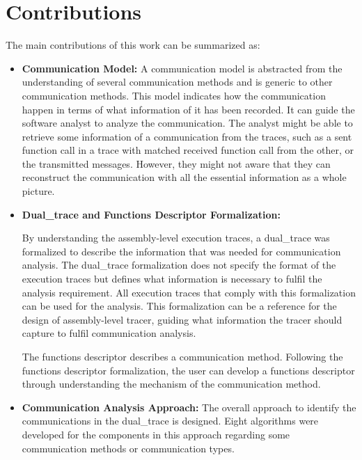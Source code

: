 \section{Contributions}
The main contributions of this work can be summarized as:
\begin{itemize}
  \item \textbf{Communication Model:} A communication model is abstracted from the understanding of several communication methods and is generic to other communication methods. This model indicates how the communication happen in terms of what information of it has been recorded. It can guide the software analyst to analyze the communication. The analyst might be able to retrieve some information of a communication from the traces, such as a sent function call in a trace with matched received function call from the other, or the transmitted messages. However, they might not aware that they can reconstruct the communication with all the essential information as a whole picture.
  
  \item \textbf{Dual\_trace and Functions Descriptor Formalization:} 
  
By understanding the assembly-level execution traces, a dual\_trace was formalized to describe the information that was needed for communication analysis. The dual\_trace formalization does not specify the format of the execution traces but defines what information is necessary to fulfil the analysis requirement. All execution traces that comply with this formalization can be used for the analysis. This formalization can be a reference for the design of assembly-level tracer, guiding what information the tracer should capture to fulfil communication analysis.

The functions descriptor describes a communication method. Following the functions descriptor formalization, the user can develop a functions descriptor through understanding the mechanism of the communication method.

  \item \textbf{Communication Analysis Approach:} The overall approach to identify the communications in the dual\_trace is designed. Eight algorithms were developed for the components in this approach regarding some communication methods or communication types. 
  

\end{itemize}
